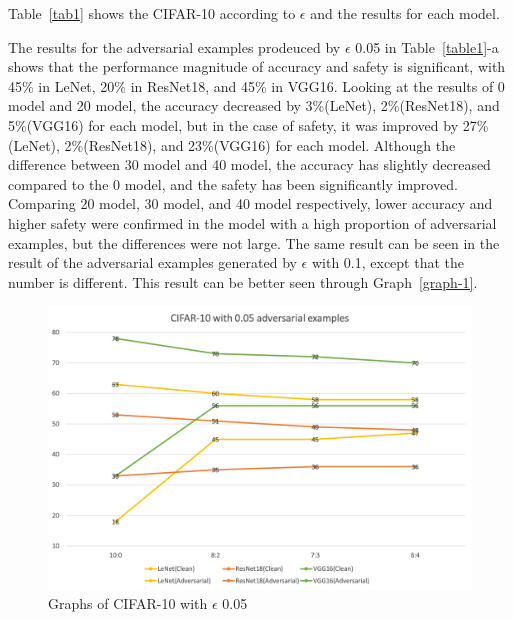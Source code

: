 \documentclass[journal,article,submit,moreauthors,pdftex]{Definitions/mdpi}
\begin{document}
Table~\ref{tab1} shows the CIFAR-10 according to \begin{math}\epsilon\end{math} and the results for each model.

The results for the adversarial examples prodeuced by \begin{math}\epsilon\end{math} 0.05 in Table~\ref{table1}-a shows that the performance magnitude of accuracy and safety is significant, with 45\%  in LeNet, 20\% in ResNet18, and 45\% in VGG16.
Looking at the results of 0 model and 20 model, the accuracy decreased by 3\%(LeNet), 2\%(ResNet18), and 5\%(VGG16) for each model, but in the case of safety, it was improved by 27\%(LeNet), 2\%(ResNet18), and 23\%(VGG16) for each model.
Although the difference between 30 model and 40 model, the accuracy has slightly decreased compared to the 0 model, and the safety has been significantly improved.
Comparing 20 model, 30 model, and 40 model respectively, lower accuracy and higher safety were confirmed in the model with a high proportion of adversarial examples, but the differences were not large.
The same result can be seen in the result of the adversarial examples generated by \begin{math}\epsilon\end{math} with 0.1, except that the number is different. This result can be better seen through Graph~\ref{graph-1}.

\begin{figure}[H]
    \includegraphics[width=13 cm]{Definitions/graph-005cifar10.png}
    \caption{Graphs of CIFAR-10 with \begin{math}\epsilon\end{math} 0.05\label{graph1}}
\end{figure} 
\end{document}
